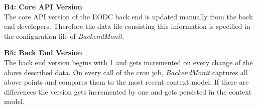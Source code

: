 \documentclass[draft,final]{vutinfth} %
\begin{document}



\textbf{B4: Core API Version} \\
The core API version of the EODC back end is updated manually from the back end developers. Therefore the data file consisting this information is specified in the configuration file of \textit{BackendMonit}. 

\textbf{B5: Back End Version} \\
The back end version begins with 1 and gets incremented on every change of the above described data. On every call of the cron job, \textit{BackendMonit} captures all above points and compares them to the most recent context model. If there are differences the version gets incremented by one and gets persisted in the context model. 
\end{document}
